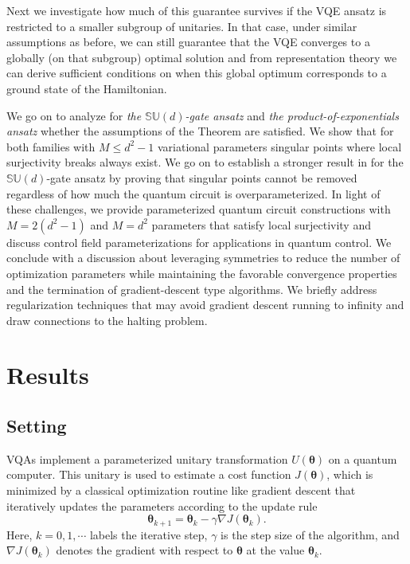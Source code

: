 \documentclass{article}
\renewcommand{\vec}[1]{\ensuremath{\boldsymbol{#1}}}
\begin{document}
\begin{multicols}{2}
Next we investigate how much of this guarantee survives if the VQE ansatz is restricted to a smaller subgroup of unitaries.
In that case, under similar assumptions as before, we can still guarantee that the VQE converges to a globally (on that subgroup) optimal solution and from representation theory we can derive sufficient conditions on when this global optimum corresponds to a ground state of the Hamiltonian.

We go on to analyze for \emph{the \(\mathbb{SU}(d)\)-gate ansatz} \cite{wiersema_here_2024, wiersema_geometric_2025, wierichs_symmetric_2023, banchi_measuring_2021, chen_special-unitary_2025} and \emph{the product-of-exponentials ansatz}
\cite{cerezo_variational_2021, leone_practical_2024, xiao_physics-constrained_2024, kandala_hardware-efficient_2017, wang_quantum_2023, hadfield_quantum_2019, golden_quantum_2023, wecker_progress_2015, park_hamiltonian_2024, anselme_martin_simulating_2022} whether the assumptions of the Theorem are satisfied. We show that for both families with $M \leq d^{2}-1$ variational parameters singular points where local surjectivity breaks always exist. We go on to establish a stronger result in  for the \(\mathbb{SU}(d)\)-gate ansatz by proving that singular points cannot be removed regardless of how much the quantum circuit is overparameterized. In light of these challenges, we provide parameterized quantum circuit constructions with $M=2(d^{2}-1)$ and $M=d^{2}$ parameters that satisfy local surjectivity and discuss control field parameterizations for applications in quantum control. We conclude with a discussion about leveraging symmetries to reduce the number of optimization parameters while maintaining the favorable convergence properties and the termination of gradient-descent type algorithms. We briefly address regularization techniques that may avoid gradient descent running to infinity and draw connections to the halting problem.

\section{Results}

\subsection{Setting}

\Glspl{VQA} implement a parameterized unitary transformation \(U(\vec{\theta})\) on a quantum computer.
This unitary is used to estimate a cost function \(J(\vec{\theta})\), which is minimized by a classical optimization routine like gradient descent that iteratively updates the parameters according to the update rule
\begin{equation}
    \label{eq:gradient_descent}
    \vec{\theta}_{k+1} = \vec{\theta}_k - \gamma \nabla J(\vec{\theta}_k).
\end{equation}
Here, $k=0,1,\cdots$ labels the iterative step, \(\gamma\) is the step size of the algorithm, and $\nabla J(\vec{\theta}_k)$ denotes the gradient with respect to $\vec{\theta}$ at the value $\vec{\theta}_k$.


\end{multicols}
\end{document}
